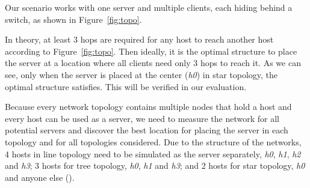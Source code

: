 Our scenario works with one server and multiple clients, each hiding behind a 
switch, as shown in Figure~\ref{fig:topo}.

In theory, at least 3 hops are required for any host to reach another host according
to Figure~\ref{fig:topo}. Then ideally, it is the optimal structure to place the server 
at a location where all clients need only 3 hops to reach it. As we can see, only 
when the server is placed at the center ({\it h0}) in star topology, the optimal 
structure satisfies. This will be verified in our evaluation.

Because every network topology contains multiple nodes that hold a host and every 
host can be used as a server, we need to measure the network for all potential servers
and discover the best location for placing the server in each topology and for all
topologies considered. Due to the structure of the networks, 4 hosts in line topology
need to be simulated as the server separately, {\it h0}, {\it h1}, {\it h2} and 
{\it h3}; 3 hosts for tree topology, {\it h0}, {\it h1} and {\it h3}; and 
2 hosts for star topology, {\it h0} and anyone else (). 